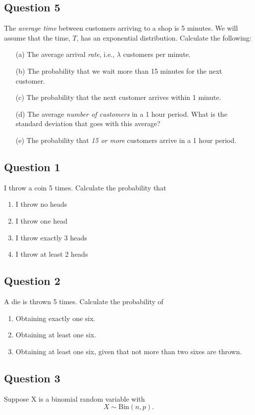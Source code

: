 \documentclass[]{article}
\begin{document}
\subsection*{Question 5}
The \emph{average time} between customers arriving to a shop is 5 minutes. We will assume that the time, $T$, has an exponential distribution. Calculate the following:\\[-0.2cm]
\begin{itemize}
\item[(a)] The average arrival \emph{rate}, i.e., $\lambda$ customers per minute.  \item[(b)] The probability that we wait more than 15 minutes for the next customer.  \item[(c)] The probability that the next customer arrives within 1 minute.  \item[(d)] The average \emph{number of customers} in a 1 hour period. What is the standard deviation that goes with this average?  \item[(e)] The probability that \emph{15 or more} customers arrive in a 1 hour period.
\end{itemize}
\subsection{Question 1}
I throw a coin 5 times. Calculate the probability that 
\begin{enumerate}

\item I throw no heads
\item I throw one head
\item I throw exactly 3 heads
\item I throw at least 2 heads
\end{enumerate}


\subsection{Question 2}
A die is thrown 5 times. Calculate the probability of 
\begin{enumerate}
\item Obtaining exactly one six.
\item Obtaining at least one six.
\item Obtaining at least one six, given that not more than two sixes are thrown.
\end{enumerate}

\subsection{Question 3}
Suppose X is a binomial random variable with
\[ X \sim \mbox{Bin}(n,p). \]
\end{document}
